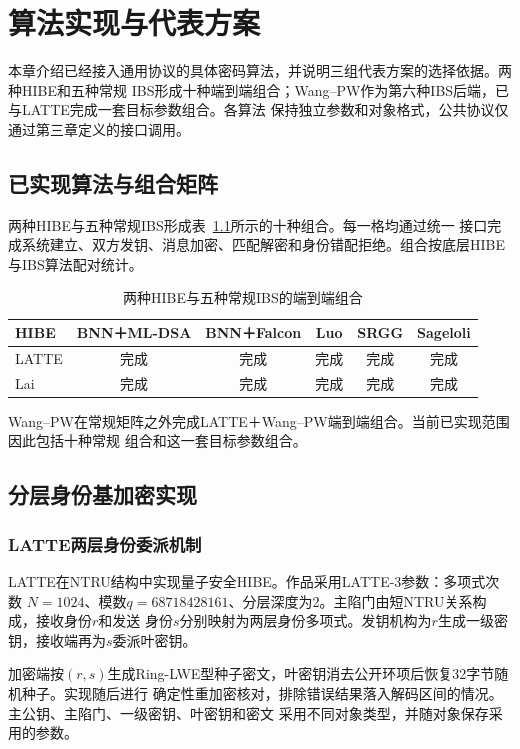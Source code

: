 \chapter{算法实现与代表方案}

本章介绍已经接入通用协议的具体密码算法，并说明三组代表方案的选择依据。两种HIBE和五种常规
IBS形成十种端到端组合；Wang--PW作为第六种IBS后端，已与LATTE完成一套目标参数组合。各算法
保持独立参数和对象格式，公共协议仅通过第三章定义的接口调用。

\section{已实现算法与组合矩阵}

两种HIBE与五种常规IBS形成表~\ref{tab:implemented-matrix}所示的十种组合。每一格均通过统一
接口完成系统建立、双方发钥、消息加密、匹配解密和身份错配拒绝。组合按底层HIBE与IBS算法配对统计。

\begin{table}[H]
\centering\small
\caption{两种HIBE与五种常规IBS的端到端组合}
\label{tab:implemented-matrix}
\begin{tabular}{@{}lccccc@{}}
\toprule
\rowcolor{black!8} HIBE & BNN＋ML-DSA & BNN＋Falcon & Luo & SRGG & Sageloli \\
\midrule
LATTE & 完成 & 完成 & 完成 & 完成 & 完成 \\
Lai & 完成 & 完成 & 完成 & 完成 & 完成 \\
\bottomrule
\end{tabular}
\end{table}

Wang--PW在常规矩阵之外完成LATTE＋Wang--PW端到端组合。当前已实现范围因此包括十种常规
组合和这一套目标参数组合。

\section{分层身份基加密实现}

\subsection{LATTE两层身份委派机制}

LATTE在NTRU结构中实现量子安全HIBE\cite{zhao2024latte}。作品采用LATTE-3参数：多项式次数
$N=1024$、模数$q=68718428161$、分层深度为2。主陷门由短NTRU关系构成，接收身份$r$和发送
身份$s$分别映射为两层身份多项式。发钥机构为$r$生成一级密钥，接收端再为$s$委派叶密钥。

加密端按$(r,s)$生成Ring-LWE型种子密文，叶密钥消去公开环项后恢复32字节随机种子。实现随后进行
确定性重加密核对，排除错误结果落入解码区间的情况。主公钥、主陷门、一级密钥、叶密钥和密文
采用不同对象类型，并随对象保存采用的参数。

